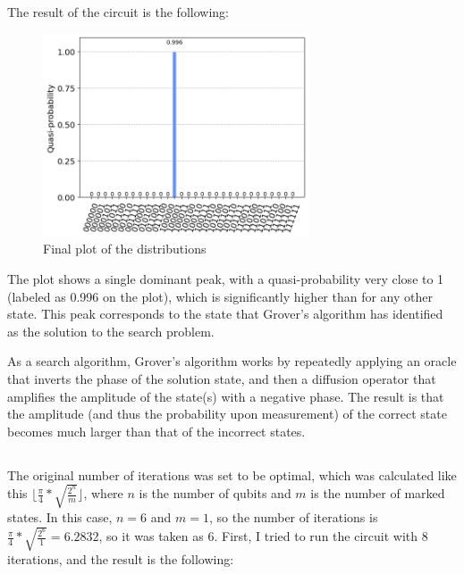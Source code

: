 \documentclass[12pt]{article}
\begin{document}
The result of the circuit is the following:

\begin{figure}[H]
    \centering
    \includegraphics[width=0.7\textwidth]{distribution.png}
    \caption{Final plot of the distributions}
\end{figure}

\newpage

The plot shows a single dominant peak, with a quasi-probability very close to 1 (labeled as 0.996 on the plot), which is significantly higher than for any other state. This peak corresponds to the state that Grover's algorithm has identified as the solution to the search problem.

As a search algorithm, Grover's algorithm works by repeatedly applying an oracle that inverts the phase of the solution state, and then a diffusion operator that amplifies the amplitude of the state(s) with a negative phase. The result is that the amplitude (and thus the probability upon measurement) of the correct state becomes much larger than that of the incorrect states.


\subsection*{}

The original number of iterations was set to be optimal, which was calculated like this  $ \lfloor \frac{\pi}{4} * \sqrt{\frac{2^{n}}{m}} \rfloor $, where $ n $ is the number of qubits and $ m $ is the number of marked states. In this case, $ n = 6 $ and $ m = 1 $, so the number of iterations is $ \frac{\pi}{4} * \sqrt{\frac{2^{6}}{1}} = 6.2832 $, so it was taken as 6. First, I tried to run the circuit with 8 iterations, and the result is the following:
\end{document}
